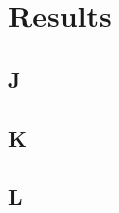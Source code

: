 \chapter{Results}\label{ch:results}

\section{J}\label{sec:J}


\section{K}\label{sec:K}

\section{L}\label{sec:L}
